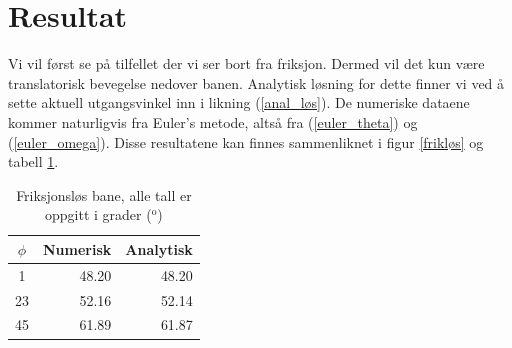\documentclass[5p]{elsarticle}
\begin{document}
	
	
	
	\section{Resultat}
	
	Vi vil først se på tilfellet der vi ser bort fra friksjon. Dermed vil det kun være translatorisk bevegelse nedover banen. Analytisk løsning for dette finner vi ved å sette aktuell utgangsvinkel inn i likning (\ref{anal_løs}). De numeriske dataene kommer naturligvis fra Euler's metode, altså fra (\ref{euler_theta}) og (\ref{euler_omega}). Disse resultatene kan finnes sammenliknet i figur \ref{frikløs} og tabell \ref{rfrikløs}.
	
	\begin{table}[H]
		\begin{center}
			\caption{Friksjonsløs bane, alle tall er oppgitt i grader ($^{\text{o}}$)}
			\label{rfrikløs}	%
			\vspace{0.5cm}					%
			\begin{tabular}{|crr|} 		    %
				\hline		%
				$\phi$  &  Numerisk & Analytisk\\  			%
				\hline
				1   &  48.20  &  48.20  \\
				23  &  52.16  &  52.14  \\
				45  &  61.89  &  61.87  \\
				\hline
			\end{tabular}
		\end{center}
	\end{table}
	
\end{document}
